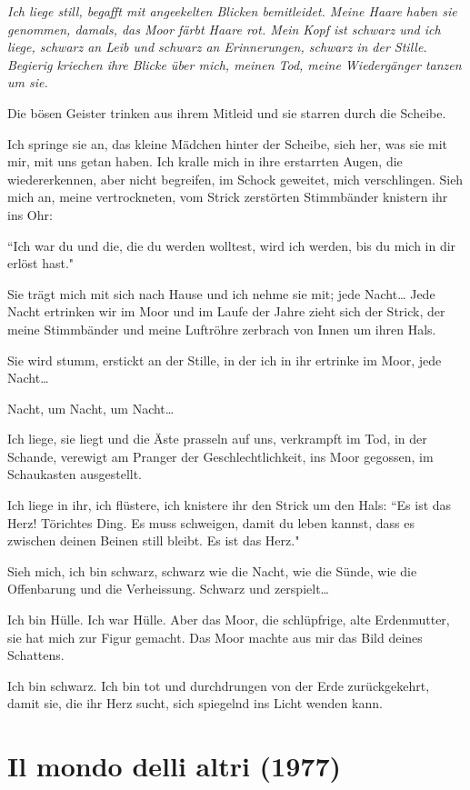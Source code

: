 \documentclass[10pt,titlepage,a5paper]{book}
\begin{document}
{\em Ich liege still, begafft  mit angeekelten Blicken bemitleidet. Meine Haare haben sie genommen, damals, das Moor färbt Haare rot.
Mein Kopf ist schwarz und ich liege, schwarz an Leib und schwarz an Erinnerungen, schwarz in der Stille. Begierig kriechen ihre Blicke über mich, meinen Tod, meine Wiedergänger tanzen um sie.

Die bösen Geister trinken aus ihrem Mitleid und sie starren durch die Scheibe.

Ich springe sie an, das kleine Mädchen hinter der Scheibe, sieh her, was sie mit mir, mit uns getan haben. Ich kralle mich in ihre erstarrten Augen, die wiedererkennen, aber nicht begreifen, im Schock geweitet, mich verschlingen. Sieh mich an, meine vertrockneten, vom Strick zerstörten Stimmbänder knistern ihr ins Ohr:

``Ich war du und die, die du werden wolltest, wird ich werden, bis du mich in dir erlöst hast."

Sie trägt mich mit sich nach Hause und ich nehme sie mit; jede Nacht\dots
Je\-de Nacht ertrinken wir im Moor und im Laufe der Jahre zieht sich der Strick, der meine Stimmbänder und meine Luftröhre zerbrach von Innen um ihren Hals.

Sie wird stumm, erstickt an der Stille, in der ich in ihr ertrinke im Moor, jede Nacht\dots

Nacht, um Nacht, um Nacht\dots

Ich liege, sie liegt und die Äste prasseln auf uns, verkrampft im Tod, in der Schande, verewigt am Pranger der Geschlechtlichkeit, ins Moor gegossen, im Schaukasten ausgestellt.

Ich liege in ihr, ich flüstere, ich knistere ihr den Strick um den Hals:
``Es ist das Herz! Törichtes Ding. Es muss schweigen, damit du leben kannst, dass es zwischen deinen Beinen still bleibt. Es ist das Herz."

Sieh mich, ich bin schwarz, schwarz wie die Nacht, wie die Sünde, wie die Offenbarung und die Verheissung. Schwarz und zerspielt\dots

Ich bin Hülle. Ich war Hülle. Aber das Moor, die schlüpfrige, alte Erdenmutter, sie hat mich zur Figur gemacht. Das Moor machte aus mir das Bild deines Schattens.

Ich bin schwarz. Ich bin tot und durchdrungen von der Erde zurückgekehrt, damit sie, die ihr Herz sucht, sich spiegelnd ins Licht wenden kann.}


\section*{Il mondo delli altri (1977)}
\end{document}

